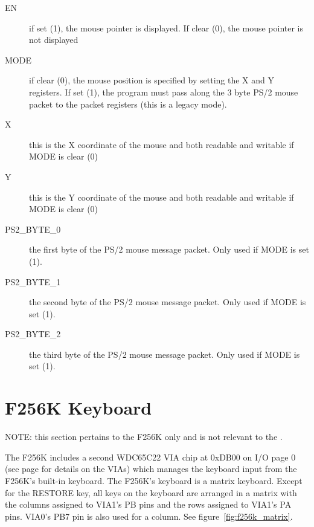 \begin{description}
    \item[EN] if set (1), the mouse pointer is displayed. If clear (0), the mouse pointer is not displayed
    \item[MODE] if clear (0), the mouse position is specified by setting the X and Y registers. If set (1), the program must pass along the 3 byte PS/2 mouse packet to the packet registers (this is a legacy mode).
    \item[X] this is the X coordinate of the mouse and both readable and writable if MODE is clear (0)
    \item[Y] this is the Y coordinate of the mouse and both readable and writable if MODE is clear (0)
    \item[PS2\_BYTE\_0] the first byte of the PS/2 mouse message packet. Only used if MODE is set (1).
    \item[PS2\_BYTE\_1] the second byte of the PS/2 mouse message packet. Only used if MODE is set (1).
    \item[PS2\_BYTE\_2] the third byte of the PS/2 mouse message packet. Only used if MODE is set (1).
\end{description}

\section*{F256K Keyboard}
\label{sec_f256k_kbd}

\begin{leftbar}
    NOTE: this section pertains to the F256K only and is not relevant to the \jr.
\end{leftbar}

The F256K includes a second WDC65C22 VIA chip at 0xDB00 on I/O page 0 (see page \pageref{chap_via} for details on the VIAs) which manages the keyboard input from the F256K's built-in keyboard. The F256K's keyboard is a matrix keyboard. Except for the RESTORE key, all keys on the keyboard are arranged in a matrix with the columns assigned to VIA1's PB pins and the rows assigned to VIA1's PA pins. VIA0's PB7 pin is also used for a column. See figure~\ref{fig:f256k_matrix}.

